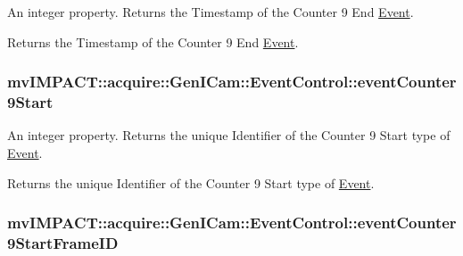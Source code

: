 An integer property. Returns the Timestamp of the Counter 9 End \hyperlink{classmv_i_m_p_a_c_t_1_1acquire_1_1_event}{Event}. 

Returns the Timestamp of the Counter 9 End \hyperlink{classmv_i_m_p_a_c_t_1_1acquire_1_1_event}{Event}. \hypertarget{classmv_i_m_p_a_c_t_1_1acquire_1_1_gen_i_cam_1_1_event_control_aaa468978d582aea7ca74aab67ffbafba}{
\subsubsection[{event\+Counter9\+Start}]{ mv\+I\+M\+P\+A\+C\+T\+::acquire\+::\+Gen\+I\+Cam\+::\+Event\+Control\+::event\+Counter9\+Start}}\label{classmv_i_m_p_a_c_t_1_1acquire_1_1_gen_i_cam_1_1_event_control_aaa468978d582aea7ca74aab67ffbafba}


An integer property. Returns the unique Identifier of the Counter 9 Start type of \hyperlink{classmv_i_m_p_a_c_t_1_1acquire_1_1_event}{Event}. 

Returns the unique Identifier of the Counter 9 Start type of \hyperlink{classmv_i_m_p_a_c_t_1_1acquire_1_1_event}{Event}. \hypertarget{classmv_i_m_p_a_c_t_1_1acquire_1_1_gen_i_cam_1_1_event_control_a4f3f815555279f487d4b4e398d985a45}{
\subsubsection[{event\+Counter9\+Start\+Frame\+I\+D}]{ mv\+I\+M\+P\+A\+C\+T\+::acquire\+::\+Gen\+I\+Cam\+::\+Event\+Control\+::event\+Counter9\+Start\+Frame\+I\+D}}\label{classmv_i_m_p_a_c_t_1_1acquire_1_1_gen_i_cam_1_1_event_control_a4f3f815555279f487d4b4e398d985a45}


